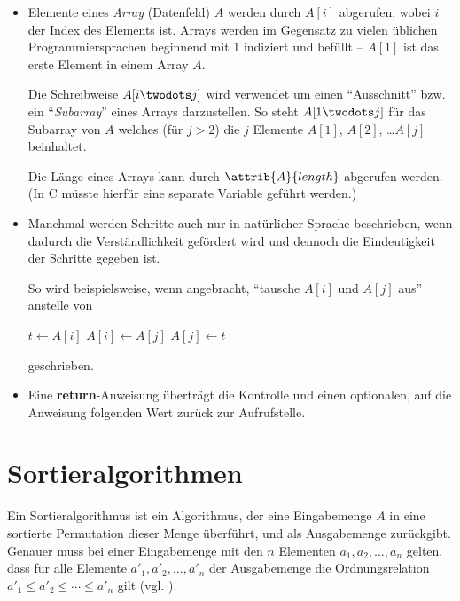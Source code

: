 \begin{itemize}
    \item Elemente eines \emph{Array} (Datenfeld) $A$ werden durch $A[i]$ abgerufen, wobei $i$ der Index des Elements ist. Arrays werden im Gegensatz zu vielen üblichen Pro\-grammier\-sprachen beginnend mit 1 indiziert und befüllt -- $A[1]$ ist das erste Element in einem Array $A$.
    
    Die Schreibweise $A[i \twodots j]$ wird verwendet um einen \enquote{Ausschnitt} bzw. ein \enquote{\emph{Subarray}} eines Arrays darzustellen. So steht $A[1 \twodots j]$ für das Subarray von $A$ welches (für $j > 2$) die $j$ Elemente $A[1]$, $A[2]$, \ldots $A[j]$ beinhaltet.
    
    Die Länge eines Arrays kann durch $\attrib{A}{length}$ abgerufen werden. (In C müsste hierfür eine separate Variable geführt werden.)

    \item Manchmal werden Schritte auch nur in natürlicher Sprache beschrieben, wenn dadurch die Verständlichkeit gefördert wird und dennoch die Eindeutigkeit der Schritte gegeben ist.

    So wird beispielsweise, wenn angebracht, \enquote{tausche $A[i]$ und $A[j]$ aus} anstelle von
    \begin{codebox}
        \li $t \gets A[i]$
        \li $A[i] \gets A[j]$
        \li $A[j] \gets t$
    \end{codebox}
    geschrieben.
    
    \item Eine \textbf{return}-Anweisung überträgt die Kontrolle und einen optionalen, auf die Anweisung folgenden Wert zurück zur Aufrufstelle.

\end{itemize}

\section{Sortieralgorithmen}
\label{sec:sorting-algorithms-definition}

Ein Sortieralgorithmus ist ein Algorithmus, der eine Eingabemenge $A$ in eine sortierte Permutation dieser Menge überführt, und als Ausgabemenge zurückgibt. Genauer muss bei einer Eingabemenge mit den $n$ Elementen $a_1, a_2, \ldots, a_n$ gelten, dass für alle Elemente $a'_1, a'_2, \ldots, a'_n$ der Ausgabemenge die Ordnungsrelation $a'_1 \leq a'_2 \leq \cdots \leq a'_n$ gilt (vgl. \cite[4]{taocp3}).

